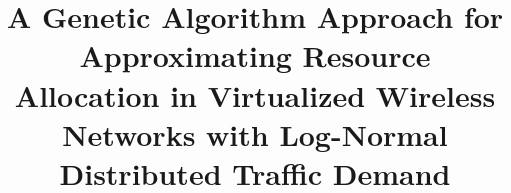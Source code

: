 \documentclass[onecolumn,draftcls]{IEEEtran}
\begin{document}
%
\title{A Genetic Algorithm Approach for Approximating Resource Allocation in Virtualized Wireless Networks with Log-Normal Distributed Traffic Demand}


\author{
}

\iffalse
\author{\IEEEauthorblockN{Kory Teague}
\IEEEauthorblockA{School of Electrical and\\Computer Engineering\\
Virginia Tech\\
Blacksburg, VA\\
Email: koryt@vt.edu}
\and
\\
\IEEEauthorblockN{Mohammad Abdel-Rahman}
\IEEEauthorblockA{School of Electrical and\\Computer Engineering\\
Virginia Tech\\
Blacksburg, VA\\
Email: mo7ammad@vt.edu}
\and
\\
\IEEEauthorblockN{Allen MacKenzie}
\IEEEauthorblockA{School of Electrical and\\Computer Engineering\\
Virginia Tech\\
Blacksburg, VA\\
Email: mackenab@vt.edu}}
\fi

\end{document}
